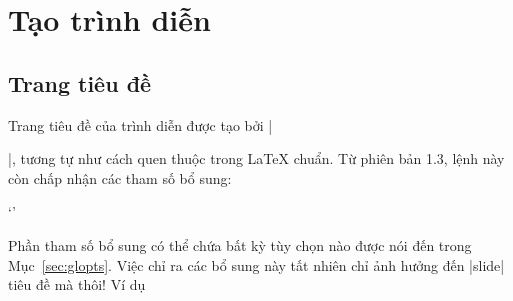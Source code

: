 
\section{\texorpdfstring{Tạo trình diễn}{Tao trinh dien}}
\label{sec:slides}


\subsection{\texorpdfstring{Trang tiêu đề}{Trang tieu de}}
\label{sec:titleslide}

\DescribeMacro{\title}
\DescribeMacro{\author}
\DescribeMacro{\and}
\DescribeMacro{\date}
\DescribeMacro{\maketitle}
Trang tiêu đề của trình diễn được tạo bởi |\maketitle|, tương tự như cách
quen thuộc trong \LaTeX{} chuẩn. Từ phiên bản 1.3, lệnh này còn chấp nhận
các tham số bổ sung:
\begin{command}
 `'
\end{command}
Phần tham số bổ sung  có thể chứa bất kỳ tùy chọn nào
được nói đến trong Mục~\vref{sec:glopts}. Việc chỉ ra các bổ sung này
tất nhiên chỉ ảnh hưởng đến |slide| tiêu đề mà thôi! Ví dụ
